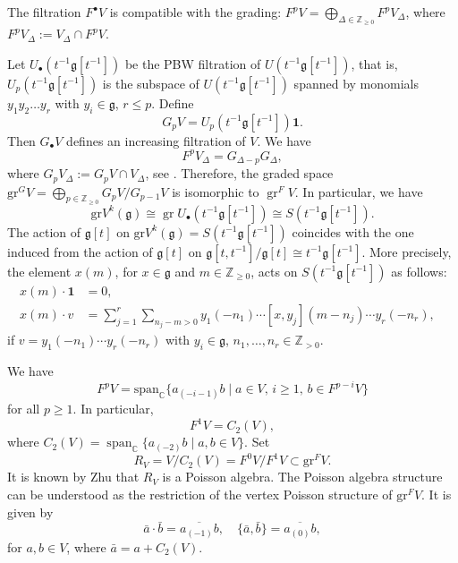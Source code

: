 \documentclass[JEP,XML,SOM,Unicode]{cedram}
\newcommand{\sbullet}{{\scriptscriptstyle\bullet}}
\let\on\operatorname
\newcommand\C{{\mathbb C}}
\newcommand\Z{{\mathbb Z}}
\newcommand \g{\mathfrak g}
\newcommand\gr{\mathrm{gr}V^{k}({\mathfrak g})}
\theoremstyle{definition}
\begin{document}
The filtration $F^\sbullet V$
is compatible with the grading:
$F^pV=\bigoplus_{\Delta\in \Z_{\geq 0}}F^pV_{\Delta}$,
where
$F^p V_\Delta := V_\Delta \cap F^p V$.

Let $U_{\sbullet}(t^{-1}\g[t^{-1}])$ be the PBW filtration of
$U(t^{-1}\g[t^{-1}])$,
that is,
$U_{p}(t^{-1}\g[t^{-1}])$
is the subspace of $U(t^{-1}\g[t^{-1}])$
spanned by monomials $y_{1} y_{2} \dots y_{r}$ with $y_i \in \g$,
$r\leq p$.
Define
\begin{equation*}
G_p V= U_{p}(t^{-1}\g[t^{-1}])\mathbf{1}.
\end{equation*}
Then $G_\sbullet V$ defines an increasing filtration of $V$.
We have
\begin{equation}
F^p V_{\Delta}=G_{\Delta-p}G_{\Delta},
\end{equation}
where
$G_p V_{\Delta}:=G_p V\cap V_{\Delta}$,
see \cite[Prop.\,2.6.1]{Ara12}.
Therefore,
the graded space $\mathrm{gr}^G V = \bigoplus_{p \in \Z_{\geq 0}}
G_p V/G_{p-1}V$ is isomorphic to $\on{gr}^F V$.
In particular,
we have
\[
\gr\cong \on{gr}U_{\sbullet}(t^{-1}\g[t^{-1}])\cong S(t^{-1}\g[t^{-1}]).
\]
The action of $\g[t]$ on $\gr=S(t^{-1}\g[t^{-1}])$
coincides with the one
induced from the action of $\g[t]$ on
$\g[t,t^{-1}]/\g[t] \cong t^{-1}\g[t^{-1}]$.
More precisely,
the element $x(m)$, for $x \in \g$ and $m \in \Z_{\geq 0}$,
acts on $S(t^{-1}\g[t^{-1}])$ as follows:
\begin{align}\nonumber
x(m)\cdot\mathbf{1} &=0, & \\\label{eq:action}
x(m) \cdot v &= \sum_{j=1}^r
\sum_{n_{j}-m >0} y_{1}(-n_1)\cdots
[x,y_{{j}}] (m- n_{j})
\cdots y_{r}(-n_r),
\end{align}
if $v =y_{1}(-n_1)\cdots y_{r}(-n_r)$
with $y_i \in \g$, $n_1,\dots,n_r \in \Z_{>0}$.

\label{sub:Zhu affine vertex algebras}

We have \cite[Lem.\,2.9]{Li05}
\[
F^p V = \mathrm{span}_\C\{ a_{(-i-1)} b \mid a \in V,\, i \geq 1,\, b \in F^{p-i} V \}
\]
for all $p \geq 1$. In particular,
\[
F^1 V = C_2(V),
\]
where $C_2(V)=\on{span}_{\C}\{a_{(-2)}b\mid a,b\in V\}$.
Set
\[
R_V = V/C_2(V) = F^0 V / F^1 V \subset \mathrm{gr}^FV.
\]
It is known by Zhu \cite{Zhu96} that $R_V$ is a Poisson algebra.
The Poisson algebra structure can be understood as the restriction of the vertex Poisson structure of $\mathrm{gr}^FV$. It is given by
\[
\bar a \cdot \bar b = \overline{a_{(-1)} b}, \quad \{\bar a, \bar b\}= \overline{a_{(0)}b},
\]
for $a, b \in V$, where $\bar a = a+C_2(V)$.
\end{document}
